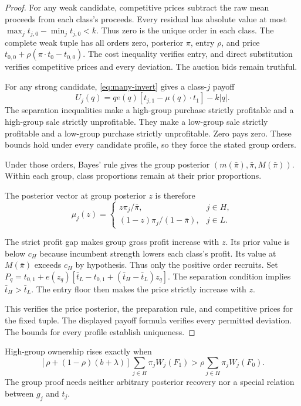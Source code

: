 \documentclass[12pt]{article}
\begin{document}
\begin{proof}
For any weak candidate, competitive prices subtract the raw mean proceeds from each class's proceeds.
Every residual has absolute value at most $\max_jt_{j,0}-\min_jt_{j,0}<k$.
Thus zero is the unique order in each class.
The complete weak tuple has all orders zero, posterior $\pi$, entry $\rho$, and price $t_{0,0}+\rho(\pi\cdot t_0-t_{0,0})$.
The cost inequality verifies entry, and direct substitution verifies competitive prices and every deviation.
The auction bids remain truthful.

For any strong candidate, \eqref{eq:many-invert} gives a class-$j$ payoff
\[
 U_j(q)=q e(q)[t_{j,1}-\mu(q)\cdot t_1]-k|q|.
\]
The separation inequalities make a high-group purchase strictly profitable and a high-group sale strictly unprofitable.
They make a low-group sale strictly profitable and a low-group purchase strictly unprofitable.
Zero pays zero.
These bounds hold under every candidate profile, so they force the stated group orders.

Under those orders, Bayes' rule gives the group posterior $(m(\bar\pi),\bar\pi,M(\bar\pi))$.
Within each group, class proportions remain at their prior proportions.

The posterior vector at group posterior $z$ is therefore
\[
 \mu_j(z)=
 \begin{cases}
 z\pi_j/\bar\pi,&j\in H,\\
 (1-z)\pi_j/(1-\bar\pi),&j\in L.
 \end{cases}
\]

The strict profit gap makes group gross profit increase with $z$.
Its prior value is below $c_H$ because incumbent strength lowers each class's profit.
Its value at $M(\bar\pi)$ exceeds $c_H$ by hypothesis.
Thus only the positive order recruits.
Set $P_q=t_{0,1}+e(z_q)[\bar t_L-t_{0,1}+(\bar t_H-\bar t_L)z_q]$.
The separation condition implies $\bar t_H>\bar t_L$.
The entry floor then makes the price strictly increase with $z$.

This verifies the price posterior, the preparation rule, and competitive prices for the fixed tuple.
The displayed payoff formula verifies every permitted deviation.
The bounds for every profile establish uniqueness.
\end{proof}

High-group ownership rises exactly when
\[
 [\rho+(1-\rho)(b+\lambda)]\sum_{j\in H}\pi_jW_j(F_1)
 >\rho\sum_{j\in H}\pi_jW_j(F_0).
\]
The group proof needs neither arbitrary posterior recovery nor a special relation between $g_j$ and $t_j$.
\end{document}
